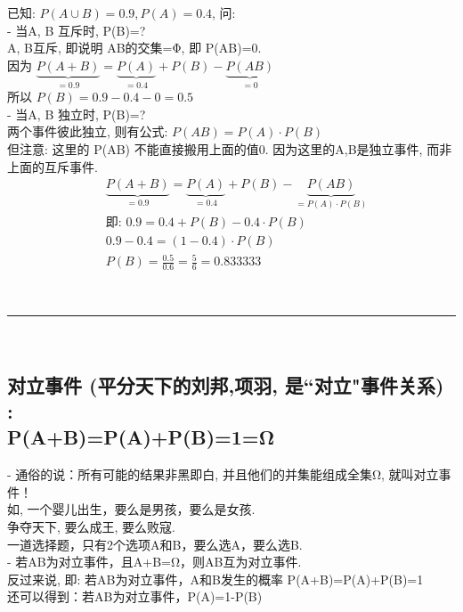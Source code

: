 \documentclass[UTF8]{ctexart}
\begin{document}
	
	\begin{myEnvSample}
		已知: $P(A \cup B)=0.9, P(A)=0.4$, 问: \\
		
		- 当A, B 互斥时, P(B)=? \\
		A, B互斥, 即说明 AB的交集=Φ,  即 P(AB)=0. \\
		因为 $\underset{=0.9}{\underbrace{P(A+B)}}=\underset{=0.4}{\underbrace{P(A)}}+P(B)-\underset{=0}{\underbrace{P(AB)}}$ \\
		所以 $P(B)=0.9-0.4-0=0.5$ \\
		
		
		
		- 当A, B 独立时, P(B)=? \\
		两个事件彼此独立, 则有公式: $P(AB) = P(A) \cdot P(B)$ \\
		但注意: 这里的 P(AB) 不能直接搬用上面的值0. 因为这里的A,B是独立事件, 而非上面的互斥事件.  
		\begin{align*}  %
			&\underset{=0.9}{\underbrace{P(A+B)}}=\underset{=0.4}{\underbrace{P(A)}}+P(B)-\underset{=P(A)\cdot P(B)}{\underbrace{P(AB)}}\\
			&\text{即:\ }0.9=0.4+P(B)-0.4\cdot P(B)\\
			&0.9-0.4=(1-0.4)\cdot P(B)\\
			&P(B)=\frac{0.5}{0.6}=\frac{5}{6}=0.833333
		\end{align*}
		
		
	\end{myEnvSample}
	
	
	~\\
	\hrule
	~\\
	
	
	\subsection{对立事件 (平分天下的刘邦,项羽, 是``对立"事件关系) : \\ P(A+B)=P(A)+P(B)=1=Ω }
	
	- 通俗的说：所有可能的结果非黑即白, 并且他们的并集能组成全集Ω, 就叫对立事件！ \\
	如, 一个婴儿出生，要么是男孩，要么是女孩. \\
	争夺天下, 要么成王, 要么败寇. \\
	一道选择题，只有2个选项A和B，要么选A，要么选B. \\
	
	
	- 若AB为对立事件，且A+B=Ω，则AB互为对立事件.  \\
	反过来说, 即: 若AB为对立事件，A和B发生的概率 P(A+B)=P(A)+P(B)=1 \\
	还可以得到：若AB为对立事件，P(A)=1-P(B) \\
	
\end{document}
